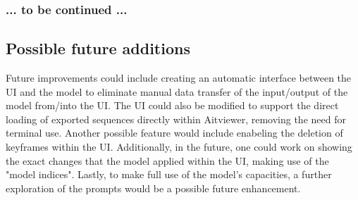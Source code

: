 \documentclass[a4paper]{scrartcl}
\begin{document}
\subsubsection*{... to be continued ...}  


\subsection*{Possible future additions}
Future improvements could include creating an automatic interface between the UI and the model to eliminate manual data transfer of the input/output of the model from/into the UI. The UI could also be modified to support the direct loading of exported sequences directly within Aitviewer, removing the need for terminal use. Another possible feature would include enabeling the deletion of keyframes within the UI. Additionally, in the future, one could work on showing the exact changes that the model applied within the UI, making use of the "model indices". Lastly, to make full use of the model's capacities, a further exploration of the prompts would be a possible future enhancement.
\end{document}
